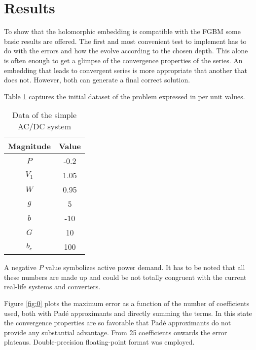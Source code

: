 \documentclass[conference]{IEEEtran}
\begin{document}
\section{Results}\label{secResults}
To show that the holomorphic embedding is compatible with the FGBM some basic results are offered. The first and most convenient test to implement has to do with the errors and how the evolve according to the chosen depth. This alone is often enough to get a glimpse of the convergence properties of the series. An embedding that leads to convergent series is more appropriate that another that does not. However, both can generate a final correct solution. 

Table \ref{tab:1} captures the initial dataset of the problem expressed in per unit values.

\begin{table}[!ht]
  \renewcommand{\arraystretch}{1.0}
  \caption{Data of the simple AC/DC system}
  \label{tab:1}
  \centering
  \begin{tabular}{cc}
  \hline
  Magnitude & Value\\
  \hline
  $P$ & -0.2\\
  $V_1$ & 1.05\\
  $W$ & 0.95\\
  $g$ & 5\\
  $b$ & -10\\
  $G$ & 10\\
  $b_c$ & 100\\
  \hline
  \end{tabular}
  \end{table}

A negative $P$ value symbolizes active power demand. It has to be noted that all these numbers are made up and could be not totally congruent with the current real-life systems and converters.

Figure \ref{fig:0} plots the maximum error as a function of the number of coefficients used, both with Padé approximants and directly summing the terms. In this state the convergence properties are so favorable that Padé approximants do not provide any substantial advantage. From 25 coefficients onwards the error plateaus. Double-precision floating-point format was employed. 
\end{document}
